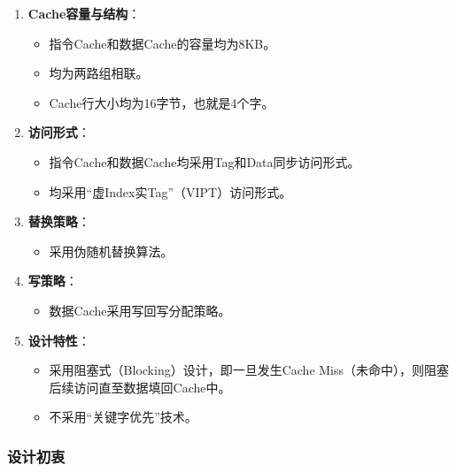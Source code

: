 \begin{enumerate}
\def\labelenumi{\arabic{enumi}.}
\tightlist
\item
  \textbf{Cache容量与结构}：

  \begin{itemize}
  \tightlist
  \item
    指令Cache和数据Cache的容量均为8KB。
  \item
    均为两路组相联。
  \item
    Cache行大小均为16字节，也就是4个字。
  \end{itemize}
\item
  \textbf{访问形式}：

  \begin{itemize}
  \tightlist
  \item
    指令Cache和数据Cache均采用Tag和Data同步访问形式。
  \item
    均采用``虚Index实Tag''（VIPT）访问形式。
  \end{itemize}
\item
  \textbf{替换策略}：

  \begin{itemize}
  \tightlist
  \item
    采用伪随机替换算法。
  \end{itemize}
\item
  \textbf{写策略}：

  \begin{itemize}
  \tightlist
  \item
    数据Cache采用写回写分配策略。
  \end{itemize}
\item
  \textbf{设计特性}：

  \begin{itemize}
  \tightlist
  \item
    采用阻塞式（Blocking）设计，即一旦发生Cache Miss（未命中），则阻塞后续访问直至数据填回Cache中。
  \item
    不采用``关键字优先''技术。
  \end{itemize}
\end{enumerate}

\subsubsection{设计初衷}\label{sec:09-cache-004}

